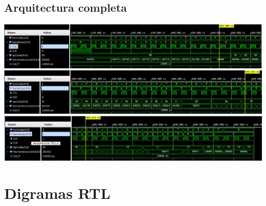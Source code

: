 \documentclass[8pt,executivepaper]{article}
\begin{document}
\subsection{Arquitectura completa}
\begin{center}
  \includegraphics[scale=0.35]{img/arquitectura-1.png}\\
  \includegraphics[scale=0.35]{img/arquitectura-2.png}\\
  \includegraphics[scale=0.35]{img/arquitectura-3.png}
\end{center}
\clearpage


\section{Digramas RTL}
\end{document}
